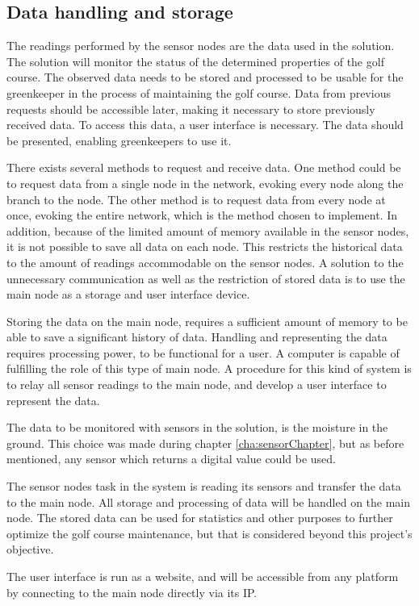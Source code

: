\iffalse
Because of the temporal limitations of the project, the user interface has not been prioritized and accordingly, no thorough development of the user interface or experience is performed. \todo{move to reflection?}
Synes ikke det giver mening at skrive her - vi har jo interface nok til det er brugbart.
\fi

\subsection{Data handling and storage}
The readings performed by the sensor nodes are the data used in the solution. The solution will monitor the status of the determined properties of the golf course. The observed data needs to be stored and processed to be usable for the greenkeeper in the process of maintaining the golf course. Data from previous requests should be accessible later, making it necessary to store previously received data. To access this data, a user interface is necessary. The data should be presented, enabling greenkeepers to use it.%

There exists several methods to request and receive data. One method could be to request data from a single node in the network, evoking every node along the branch to the node. The other method is to request data from every node at once, evoking the entire network, which is the method chosen to implement. In addition, because of the limited amount of memory available in the sensor nodes, it is not possible to save all data on each node. This restricts the historical data to the amount of readings accommodable on the sensor nodes. A solution to the unnecessary communication as well as the restriction of stored data is to use the main node as a storage and user interface device.

Storing the data on the main node, requires a sufficient amount of memory to be able to save a significant history of data. Handling and representing the data requires processing power, to be functional for a user. A computer is capable of fulfilling the role of this type of main node. A procedure for this kind of system is to relay all sensor readings to the main node, and develop a user interface to represent the data. 

The data to be monitored with sensors in the solution, is the moisture in the ground. This choice was made during chapter \ref{cha:sensorChapter}, but as before mentioned, any sensor which returns a digital value could be used.

The sensor nodes task in the system is reading its sensors and transfer the data to the main node. All storage and processing of data will be handled on the main node.
The stored data can be used for statistics and other purposes to further optimize the golf course maintenance, but that is considered beyond this project's objective.

The user interface is run as a website, and will be accessible from any platform by connecting to the main node directly via its IP.